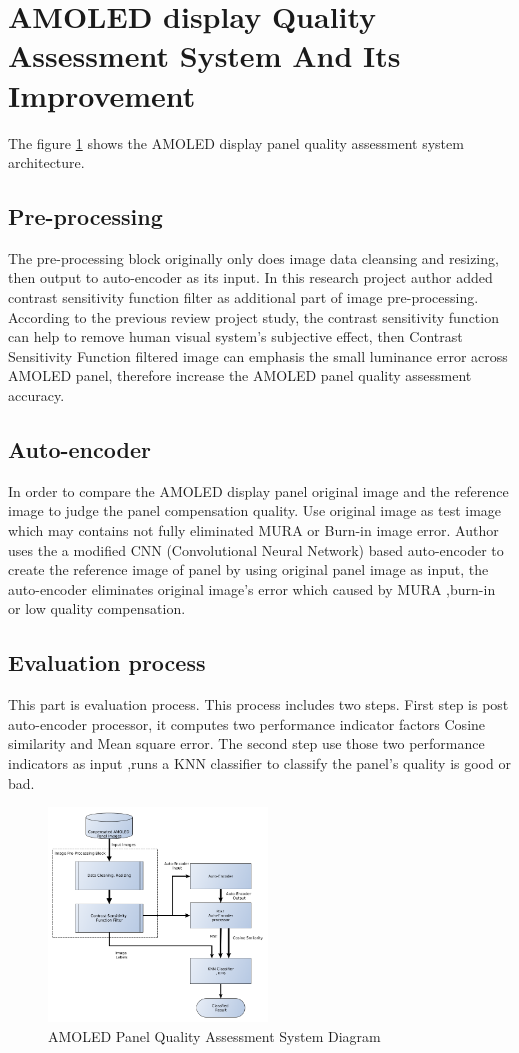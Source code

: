 \documentclass{article}
\begin{document}
\section{AMOLED display Quality Assessment System And Its Improvement }
The figure \ref{fig_sys_diagram} shows the AMOLED display panel quality assessment system architecture.
\subsection{Pre-processing}
The pre-processing block originally only does image data cleansing and resizing, then output to auto-encoder as its input. In this research project author added contrast sensitivity function filter as additional part of image pre-processing. According to the previous review project study, the contrast sensitivity function can help to remove human visual system's subjective effect, then Contrast Sensitivity Function filtered image can emphasis the small luminance error across AMOLED panel, therefore increase the AMOLED panel quality assessment accuracy.
\subsection{Auto-encoder}
In order to compare the AMOLED display panel original image and the reference image to judge the panel compensation quality. Use original image as test image which may contains not fully eliminated MURA or Burn-in image error. Author uses the a modified CNN (Convolutional Neural Network) based auto-encoder to create the reference image of panel by using original panel image as input, the auto-encoder eliminates original image's error which caused by MURA ,burn-in or low quality compensation.
\subsection{Evaluation process}
This part is evaluation process. This process includes two steps. First step is post auto-encoder processor, it computes two performance indicator factors Cosine similarity and Mean square error. The second step use those two performance indicators as input ,runs a KNN classifier to classify the panel's quality is good or bad.
\begin{figure}[h]
    \centering
    \includegraphics[width=0.52\textwidth]{images/system_diagram.png}\vfill
    \caption{AMOLED Panel Quality Assessment System Diagram}
    \label{fig_sys_diagram}
\end{figure}
\end{document}
